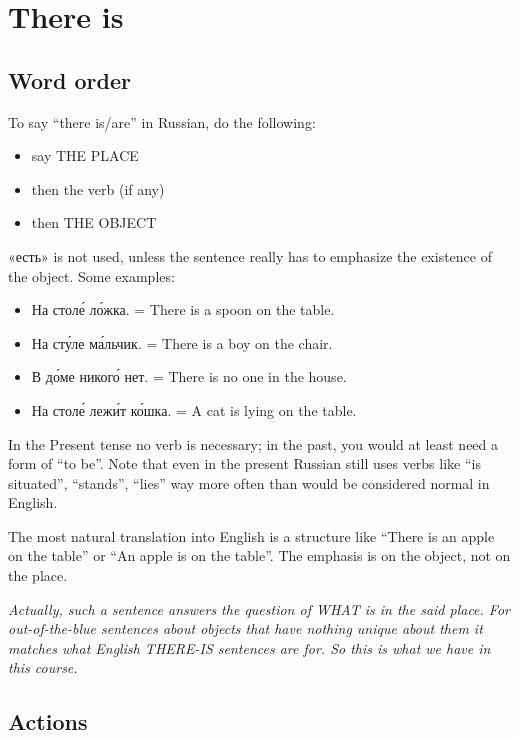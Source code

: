 \chapter{There is}\label{there-is}

\section{Word order}\label{word-order}

To say ``there is/are'' in Russian, do the following:

\begin{itemize}
\tightlist
\item
  say THE PLACE
\item
  then the verb (if any)
\item
  then THE OBJECT
\end{itemize}

«есть» is not used, unless the sentence really has to emphasize the
existence of the object. Some examples:

\begin{itemize}
\tightlist
\item
  На стол\'{е} л\'{о}жка. = There is a spoon on the table.
\item
  На ст\'{у}ле м\'{а}льчик. = There is a boy on the chair.
\item
  В д\'{о}ме никог\'{о} нет. = There is no one in the house.
\item
  На стол\'{е} леж\'{и}т к\'{о}шка. = A cat is lying on the table.
\end{itemize}

In the Present tense no verb is necessary; in the past, you would at
least need a form of ``to be''. Note that even in the present Russian
still uses verbs like ``is situated'', ``stands'', ``lies'' way more
often than would be considered normal in English.

The most natural translation into English is a structure like ``There is
an apple on the table'' or ``An apple is on the table''. The emphasis is
on the object, not on the place.

\emph{Actually, such a sentence answers the question of WHAT is in the
said place. For out-of-the-blue sentences about objects that have
nothing unique about them it matches what English THERE-IS sentences are
for. So this is what we have in this course.}

\section{Actions}\label{actions}


